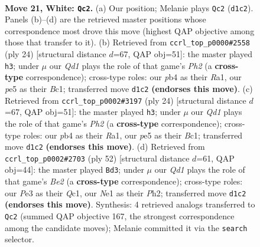\documentclass[11pt]{article}
\begin{document}
\clearpage

\begin{figure}[p]\centering
\begin{subfigure}{0.46\textwidth}\centering
\resizebox{\linewidth}{!}{%
\newchessgame
\chessboard[
  setfen={nrbr2k1/p3qpbp/8/2p1pn1P/1p6/3PPB2/PP3P2/RNBQNRK1 w - - 0 21},
  showmover=false,
  pgfstyle=straightmove, color=movearrow, markmove={d1-c2}
]}
\caption{}
\end{subfigure}\hfill
\begin{subfigure}{0.46\textwidth}\centering
\resizebox{\linewidth}{!}{%
\newchessgame
\chessboard[
  setfen={r1bq1rk1/2p2ppp/p4n2/2b1p3/Pp2P3/1B6/1PPN1PPP/R1BQR1K1 w - - 2 13},
  showmover=false,
  pgfstyle=straightmove, color=movearrow, markmove={h2-h3}
]}
\caption{}
\end{subfigure}
\\[4pt]
\begin{subfigure}{0.46\textwidth}\centering
\resizebox{\linewidth}{!}{%
\newchessgame
\chessboard[
  setfen={r1bq1rk1/2p2ppp/p4n2/2b1p3/Pp2P3/1B6/1PPN1PPP/R1BQR1K1 w - - 2 13},
  showmover=false,
  pgfstyle=straightmove, color=movearrow, markmove={h2-h3}
]}
\caption{}
\end{subfigure}\hfill
\begin{subfigure}{0.46\textwidth}\centering
\resizebox{\linewidth}{!}{%
\newchessgame
\chessboard[
  setfen={6rk/2pqnrbp/b2p4/P1pPpp2/2P5/R1N2P2/3BB1PP/2Q2R1K w - - 12 27},
  showmover=false,
  pgfstyle=straightmove, color=movearrow, markmove={e2-d3}
]}
\caption{}
\end{subfigure}
\caption{\textbf{Move 21, White: \texttt{Qc2}.} (a) Our position; Melanie plays \texttt{Qc2} (\texttt{d1c2}). Panels (b)--(d) are the retrieved master positions whose correspondence most drove this move (highest QAP objective among those that transfer to it). (b) Retrieved from \texttt{ccrl\_top\_p0000\#2558} (ply 24) [structural distance $d$=67, QAP obj=51]: the master played \texttt{h3}; under $\mu$ our \emph{Qd1} plays the role of that game's \emph{Ph2} (a \textbf{cross-type} correspondence); cross-type roles: our \emph{p}b4 as their \emph{R}a1, our \emph{p}e5 as their \emph{B}c1; transferred move \texttt{d1c2} \textbf{(endorses this move)}. (c) Retrieved from \texttt{ccrl\_top\_p0002\#3197} (ply 24) [structural distance $d$=67, QAP obj=51]: the master played \texttt{h3}; under $\mu$ our \emph{Qd1} plays the role of that game's \emph{Ph2} (a \textbf{cross-type} correspondence); cross-type roles: our \emph{p}b4 as their \emph{R}a1, our \emph{p}e5 as their \emph{B}c1; transferred move \texttt{d1c2} \textbf{(endorses this move)}. (d) Retrieved from \texttt{ccrl\_top\_p0002\#2703} (ply 52) [structural distance $d$=61, QAP obj=44]: the master played \texttt{Bd3}; under $\mu$ our \emph{Qd1} plays the role of that game's \emph{Be2} (a \textbf{cross-type} correspondence); cross-type roles: our \emph{P}e3 as their \emph{Q}c1, our \emph{N}e1 as their \emph{P}h2; transferred move \texttt{d1c2} \textbf{(endorses this move)}. Synthesis: 4 retrieved analogs transferred to \texttt{Qc2} (summed QAP objective 167, the strongest correspondence among the candidate moves); Melanie committed it via the \texttt{search} selector.}
\label{fig:thought-m40}
\end{figure}
\end{document}
